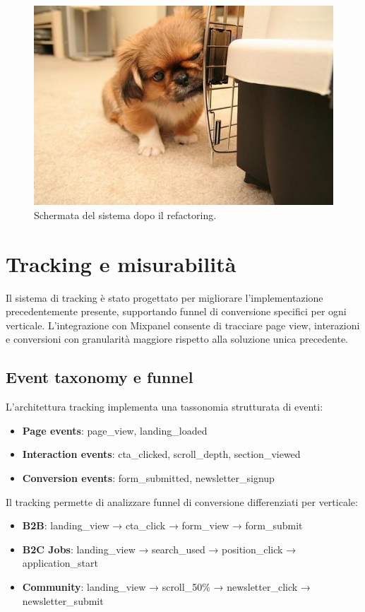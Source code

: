 \begin{figure}[h!]
    \centering
    \includegraphics[width=1\textwidth]{chapters/images/n02086079_422.jpg}
    \caption{Schermata del sistema dopo il refactoring.}
    \label{fig:refactoring}
\end{figure}

\section{Tracking e misurabilità}
Il sistema di tracking è stato progettato per migliorare l'implementazione 
precedentemente presente, supportando funnel di conversione specifici per ogni 
verticale. L'integrazione con Mixpanel consente di tracciare page view, 
interazioni e conversioni con granularità maggiore rispetto alla soluzione unica 
precedente.

\subsection{Event taxonomy e funnel}
L'architettura tracking implementa una tassonomia strutturata di eventi:
\begin{itemize}
  \item \textbf{Page events}: page\_view, landing\_loaded
  \item \textbf{Interaction events}: cta\_clicked, scroll\_depth, section\_viewed
  \item \textbf{Conversion events}: form\_submitted, newsletter\_signup
\end{itemize}

Il tracking permette di analizzare funnel di conversione differenziati per verticale:
\begin{itemize}
  \item \textbf{B2B}: landing\_view → cta\_click → form\_view → form\_submit
  \item \textbf{B2C Jobs}: landing\_view → search\_used → position\_click → application\_start
  \item \textbf{Community}: landing\_view → scroll\_50\% → newsletter\_click → newsletter\_submit
\end{itemize}

